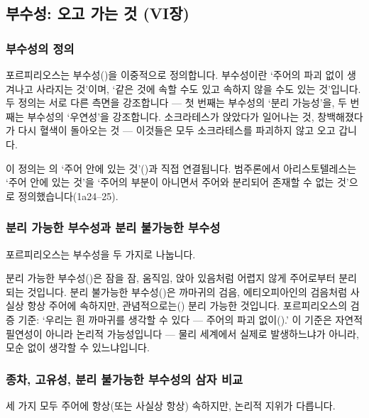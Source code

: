 \documentclass[12pt, a4paper]{article}
\begin{document}
\thispagestyle{firstpage}


\subsection{부수성: 오고 가는 것 (VI장)}

\subsubsection{부수성의 정의}

포르피리오스는 부수성()을 이중적으로 정의합니다. 부수성이란 `주어의 파괴 없이 생겨나고 사라지는 것'이며, `같은 것에 속할 수도 있고 속하지 않을 수도 있는 것'입니다. 두 정의는 서로 다른 측면을 강조합니다 --- 첫 번째는 부수성의 `분리 가능성'을, 두 번째는 부수성의 `우연성'을 강조합니다. 소크라테스가 앉았다가 일어나는 것, 창백해졌다가 다시 혈색이 돌아오는 것 --- 이것들은 모두 소크라테스를 파괴하지 않고 오고 갑니다.

이 정의는 의 `주어 안에 있는 것'()과 직접 연결됩니다. 범주론에서 아리스토텔레스는 `주어 안에 있는 것'을 `주어의 부분이 아니면서 주어와 분리되어 존재할 수 없는 것'으로 정의했습니다(1a24--25).

\subsubsection{분리 가능한 부수성과 분리 불가능한 부수성}

포르피리오스는 부수성을 두 가지로 나눕니다.

분리 가능한 부수성()은 잠을 잠, 움직임, 앉아 있음처럼 어렵지 않게 주어로부터 분리되는 것입니다. 분리 불가능한 부수성()은 까마귀의 검음, 에티오피아인의 검음처럼 사실상 항상 주어에 속하지만, 관념적으로는() 분리 가능한 것입니다. 포르피리오스의 검증 기준: `우리는 흰 까마귀를 생각할 수 있다 --- 주어의 파괴 없이().' 이 기준은 자연적 필연성이 아니라 논리적 가능성입니다 --- 물리 세계에서 실제로 발생하느냐가 아니라, 모순 없이 생각할 수 있느냐입니다.

\subsubsection{종차, 고유성, 분리 불가능한 부수성의 삼자 비교}

세 가지 모두 주어에 항상(또는 사실상 항상) 속하지만, 논리적 지위가 다릅니다.
\end{document}
